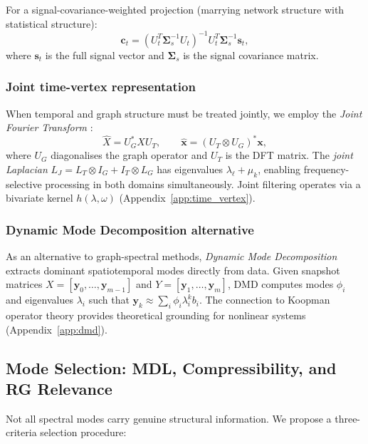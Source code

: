 \documentclass[11pt,a4paper]{article}
\theoremstyle{definition}
\newcommand{\bx}{\bm{x}}
\newcommand{\by}{\bm{y}}
\newcommand{\bs}{\bm{s}}
\newcommand{\bc}{\bm{c}}
\newcommand{\bSigma}{\bm{\Sigma}}
\begin{document}
For a signal-covariance-weighted projection (marrying network structure with statistical structure):
\begin{equation}
  \bc_t = (U_t^T \bSigma_s^{-1} U_t)^{-1} U_t^T \bSigma_s^{-1} \bs_t,
  \label{eq:weighted_projection}
\end{equation}
where $\bs_t$ is the full signal vector and $\bSigma_s$ is the signal covariance matrix.

\subsubsection{Joint time-vertex representation}

When temporal and graph structure must be treated jointly, we employ the \emph{Joint Fourier Transform} \citep{grassi2018time}:
\begin{equation}
  \hat{X} = U_G^* X U_T, \qquad \hat{\bx} = (U_T \otimes U_G)^* \bx,
  \label{eq:jft}
\end{equation}
where $U_G$ diagonalises the graph operator and $U_T$ is the DFT matrix. The \emph{joint Laplacian} $L_J = L_T \otimes I_G + I_T \otimes L_G$ has eigenvalues $\lambda_\ell + \mu_k$, enabling frequency-selective processing in both domains simultaneously. Joint filtering operates via a bivariate kernel $h(\lambda, \omega)$ (Appendix~\ref{app:time_vertex}).

\subsubsection{Dynamic Mode Decomposition alternative}

As an alternative to graph-spectral methods, \emph{Dynamic Mode Decomposition} \citep{tu2014dynamic} extracts dominant spatiotemporal modes directly from data. Given snapshot matrices $X = [\by_0, \ldots, \by_{m-1}]$ and $Y = [\by_1, \ldots, \by_m]$, DMD computes modes $\phi_i$ and eigenvalues $\lambda_i$ such that $\by_k \approx \sum_i \phi_i \lambda_i^k b_i$. The connection to Koopman operator theory provides theoretical grounding for nonlinear systems (Appendix~\ref{app:dmd}).

\subsection{Mode Selection: MDL, Compressibility, and RG Relevance}
\label{sec:mode_selection}

Not all spectral modes carry genuine structural information. We propose a three-criteria selection procedure:
\end{document}
